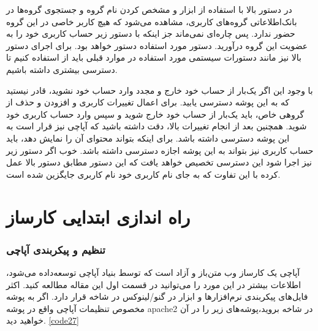 در دستور بالا با استفاده از ابزار 
 و مشخص کردن نام گروه و جستجوی گروه‌ها در بانک‌اطلاعاتی گروه‌های کاربری، مشاهده می‌شود که هیچ کاربر خاصی در این گروه حضور ندارد. پس چاره‌ای نمی‌ماند جز اینکه با دستور زیر حساب کاربری خود را به عضویت این گروه در‌آورید.  دستور مورد استفاده دستور 
  خواهد بود. برای اجرای دستور بالا نیز مانند دستورات سیستمی مورد استفاده در موارد قبلی باید از 
   استفاده کنیم تا دسترسی بیشتری داشته باشیم.

\begin{latin}
    
\end{latin}
با وجود این اگر یک‌بار از حساب خود خارج و مجدد وارد حساب خود نشوید، قادر نیستید که به این پوشه دسترسی یابید. برای اعمال تغییرات کاربری و افزودن و حذف از گروهی خاص، باید یک‌بار از حساب خود خارج شوید و سپس وارد حساب کاربری خود شوید. همچنین بعد از انجام تغییرات بالا، دقت داشته باشید که آپاچی نیز قرار است به این پوشه دسترسی داشته باشد. برای اینکه بتواند محتوای آن را نمایش دهد، باید حساب کاربری  
نیز بتواند به این پوشه اجازه دسترسی داشته باشد. خوب اگر دستور زیر نیز اجرا شود این دسترسی تخصیص خواهد یافت که این دستور مطابق دستور بالا عمل کرده با این تفاوت که به جای نام کاربری خود نام کاربری  جایگزین شده است.
\begin{latin}
    
\end{latin}

\part*{راه اندازی ابتدایی کارساز}
\section{تنظیم و پیکربندی آپاچی}
آپاچی یک کارساز وب متن‌باز و آزاد است که توسط بنیاد آپاچی توسعه‌داده می‌شود، اطلاعات بیشتر در این مورد را می‌توانید در قسمت اول این مقاله مطالعه کنید. اکثر فایل‌های پیکربندی نرم‌افزارها و ابزار در گنو/لینوکس در شاخه  
 قرار دارد. اگر به پوشه مخصوص تنظیمات آپاچی واقع در پوشه apache2 در شاخه 
 بروید،پوشه‌های زیر را در آن خواهید دید. \ref{code27}
\newline
\begin{latin}
    \label{code27}
    
\end{latin}

